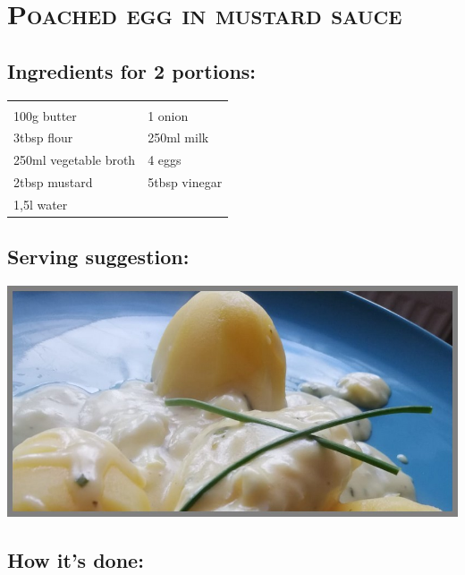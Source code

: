 \section{\textsc{Poached egg in mustard sauce}}

\subsection*{Ingredients for 2 portions:}

\begin{tabular}{p{7.5cm} p{7.5cm}}
	& \\
	100g butter & 1 onion \\
	3tbsp flour & 250ml milk \\
  250ml vegetable broth & 4 eggs \\
  2tbsp mustard & 5tbsp vinegar \\
  1,5l water &
\end{tabular}

\subsection*{Serving suggestion:}

\includegraphics[width=\textwidth]{img/pohiertes_senfei.jpeg} \cite{eisenfsosse}

\subsection*{How it's done:}

